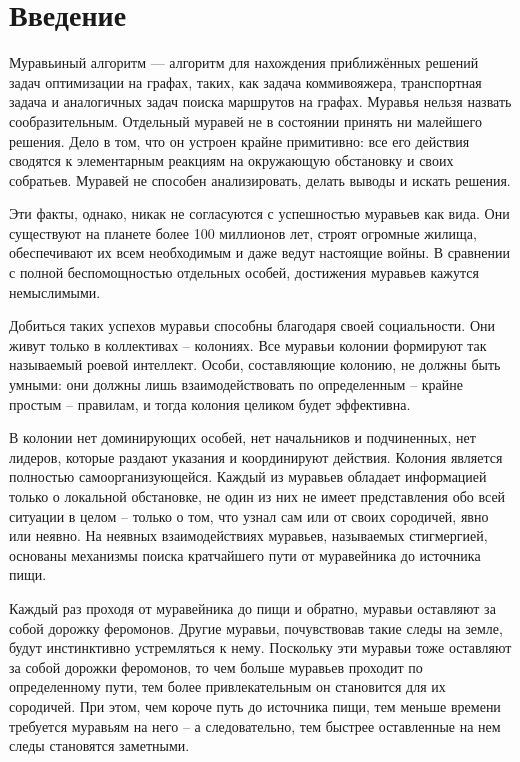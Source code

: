 \chapter*{Введение}

Муравьиный алгоритм — алгоритм для нахождения приближённых решений задач оптимизации на графах, таких, как задача коммивояжера, транспортная задача и аналогичных задач поиска маршрутов на графах. 
Муравья нельзя назвать сообразительным.
Отдельный муравей не в состоянии принять ни малейшего решения.
Дело в том, что он устроен крайне примитивно: все его действия сводятся к элементарным реакциям на окружающую обстановку и своих собратьев.
Муравей не способен анализировать, делать выводы и искать решения.

Эти факты, однако, никак не согласуются с успешностью муравьев как вида.
Они существуют на планете более 100 миллионов лет, строят огромные жилища, обеспечивают их всем необходимым и даже ведут настоящие войны.
В сравнении с полной беспомощностью отдельных особей, достижения муравьев кажутся немыслимыми.

Добиться таких успехов муравьи способны благодаря своей социальности.
Они живут только в коллективах – колониях. Все муравьи колонии формируют так называемый роевой интеллект.
Особи, составляющие колонию, не должны быть умными: они должны лишь взаимодействовать по определенным – крайне простым – правилам, и тогда колония целиком будет эффективна.

В колонии нет доминирующих особей, нет начальников и подчиненных, нет лидеров, которые раздают указания и координируют действия.
Колония является полностью самоорганизующейся.
Каждый из муравьев обладает информацией только о локальной обстановке, не один из них не имеет представления обо всей ситуации в целом – только о том, что узнал сам или от своих сородичей, явно или неявно.
На неявных взаимодействиях муравьев, называемых стигмергией, основаны механизмы поиска кратчайшего пути от муравейника до источника пищи.

Каждый раз проходя от муравейника до пищи и обратно, муравьи оставляют за собой дорожку феромонов.
Другие муравьи, почувствовав такие следы на земле, будут инстинктивно устремляться к нему.
Поскольку эти муравьи тоже оставляют за собой дорожки феромонов, то чем больше муравьев проходит по определенному пути, тем более привлекательным он становится для их сородичей.
При этом, чем короче путь до источника пищи, тем меньше времени требуется муравьям на него – а следовательно, тем быстрее оставленные на нем следы становятся заметными.

